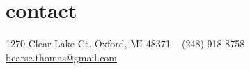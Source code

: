 \section{contact}
1270 Clear Lake Ct.
Oxford, MI 48371
~
(248) 918 8758
\href{mailto:bearse.thomas@gmail.com}{bearse.thomas@gmail.com}
